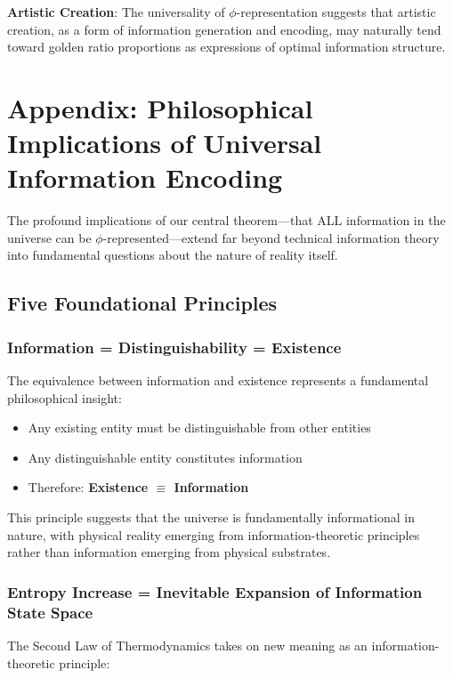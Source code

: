 \documentclass[12pt,letterpaper]{article}
\begin{document}
\textbf{Artistic Creation}: The universality of $\phi$-representation suggests that artistic creation, as a form of information generation and encoding, may naturally tend toward golden ratio proportions as expressions of optimal information structure.

\section{Appendix: Philosophical Implications of Universal Information Encoding}

The profound implications of our central theorem—that ALL information in the universe can be $\phi$-represented—extend far beyond technical information theory into fundamental questions about the nature of reality itself.

\subsection{Five Foundational Principles}

\subsubsection{Information = Distinguishability = Existence}

The equivalence between information and existence represents a fundamental philosophical insight:

\begin{itemize}
\item Any existing entity must be distinguishable from other entities
\item Any distinguishable entity constitutes information
\item Therefore: \textbf{Existence $\equiv$ Information}
\end{itemize}

This principle suggests that the universe is fundamentally informational in nature, with physical reality emerging from information-theoretic principles rather than information emerging from physical substrates.

\subsubsection{Entropy Increase = Inevitable Expansion of Information State Space}

The Second Law of Thermodynamics takes on new meaning as an information-theoretic principle:
\end{document}
